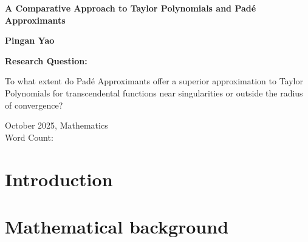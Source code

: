 \documentclass[a4paper, 12pt]{article}
\begin{document}
\doublespacing %

\begin{titlepage}
    \begin{center}
    
        \vspace*{2cm}
        {\Huge \textbf{A Comparative Approach to Taylor Polynomials and Padé Approximants}\par}
        
        \vspace{1.5cm}
        {\Large \textbf{Pingan Yao}\par} %
        
        \vspace{2cm}
        \Large
        \textbf{Research Question:}
        
        \vspace{0.5cm}
        \LARGE To what extent do Padé Approximants offer a superior approximation to Taylor Polynomials for transcendental functions near singularities or outside the radius of convergence?

        \vspace{1.5cm}

        \Large
        October 2025, Mathematics\\
        Word Count:
        
    \end{center}
\end{titlepage}

\newpage

\tableofcontents
\newpage
\listoffigures

\newpage

\setcounter{page}{1}

\section{Introduction} 

\section{Mathematical background} %
\end{document}
